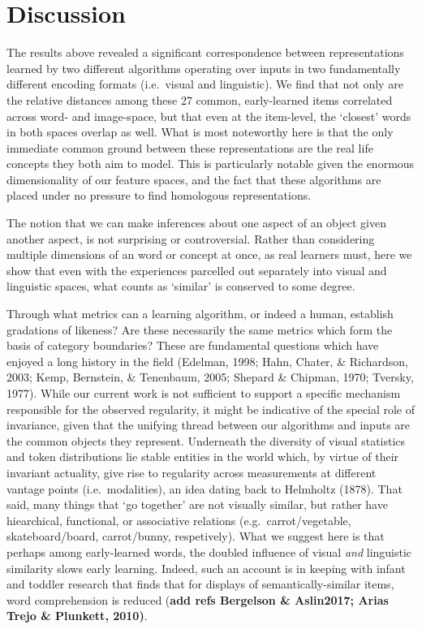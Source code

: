 \documentclass[10pt, letterpaper]{article}
\begin{document}
\section{Discussion}\label{discussion}

The results above revealed a significant correspondence between
representations learned by two different algorithms operating over
inputs in two fundamentally different encoding formats (i.e.~visual and
linguistic). We find that not only are the relative distances among
these 27 common, early-learned items correlated across word- and
image-space, but that even at the item-level, the `closest' words in
both spaces overlap as well. What is most noteworthy here is that the
only immediate common ground between these representations are the real
life concepts they both aim to model. This is particularly notable given
the enormous dimensionality of our feature spaces, and the fact that
these algorithms are placed under no pressure to find homologous
representations.

The notion that we can make inferences about one aspect of an object
given another aspect, is not surprising or controversial. Rather than
considering multiple dimensions of an word or concept at once, as real
learners must, here we show that even with the experiences parcelled out
separately into visual and linguistic spaces, what counts as `similar'
is conserved to some degree.

Through what metrics can a learning algorithm, or indeed a human,
establish gradations of likeness? Are these necessarily the same metrics
which form the basis of category boundaries? These are fundamental
questions which have enjoyed a long history in the field (Edelman, 1998;
Hahn, Chater, \& Richardson, 2003; Kemp, Bernstein, \& Tenenbaum, 2005;
Shepard \& Chipman, 1970; Tversky, 1977). While our current work is not
sufficient to support a specific mechanism responsible for the observed
regularity, it might be indicative of the special role of invariance,
given that the unifying thread between our algorithms and inputs are the
common objects they represent. Underneath the diversity of visual
statistics and token distributions lie stable entities in the world
which, by virtue of their invariant actuality, give rise to regularity
across measurements at different vantage points (i.e.~modalities), an
idea dating back to Helmholtz (1878). That said, many things that `go
together' are not visually similar, but rather have hiearchical,
functional, or associative relations (e.g.~carrot/vegetable,
skateboard/board, carrot/bunny, respetively). What we suggest here is
that perhaps among early-learned words, the doubled influence of visual
\emph{and} linguistic similarity slows early learning. Indeed, such an
account is in keeping with infant and toddler research that finds that
for displays of semantically-similar items, word comprehension is
reduced (\textbf{add refs Bergelson \& Aslin2017; Arias Trejo \&
Plunkett, 2010)}.
\end{document}
